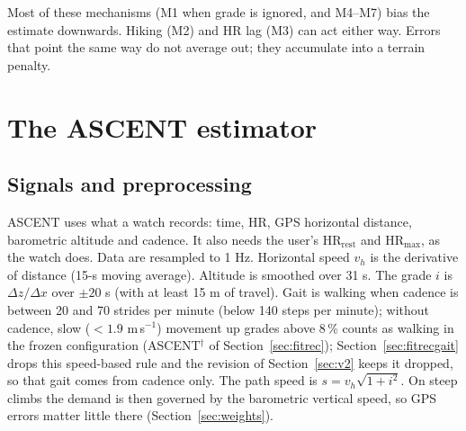 \documentclass[11pt,a4paper]{article}
\newcommand{\HRmax}{\ensuremath{\mathrm{HR}_{\max}}}
\newcommand{\HRrest}{\ensuremath{\mathrm{HR}_{\mathrm{rest}}}}
\newcommand{\ascent}{ASCENT}
\begin{document}
\noindent Most of these mechanisms (M1 when grade is ignored, and M4--M7) bias the estimate downwards. Hiking (M2) and HR lag (M3) can act either way. Errors that point the same way do not average out; they accumulate into a terrain penalty.

\section{The \ascent{} estimator}\label{sec:ascent}

\subsection{Signals and preprocessing}
\ascent{} uses what a watch records: time, HR, GPS horizontal distance, barometric altitude and cadence. It also needs the user's \HRrest{} and \HRmax{}, as the watch does. Data are resampled to 1 Hz. Horizontal speed $v_h$ is the derivative of distance (15-s moving average). Altitude is smoothed over 31 s. The grade $i$ is $\Delta z/\Delta x$ over $\pm20$ s (with at least 15 m of travel). Gait is walking when cadence is between 20 and 70 strides per minute (below 140 steps per minute); without cadence, slow ($<1.9$ m\,s$^{-1}$) movement up grades above 8\,\% counts as walking in the frozen configuration (\ascent$^{\dagger}$ of Section~\ref{sec:fitrec}); Section~\ref{sec:fitrecgait} drops this speed-based rule and the revision of Section~\ref{sec:v2} keeps it dropped, so that gait comes from cadence only. The path speed is $s=v_h\sqrt{1+i^2}$. On steep climbs the demand is then governed by the barometric vertical speed, so GPS errors matter little there (Section~\ref{sec:weights}).
\end{document}
